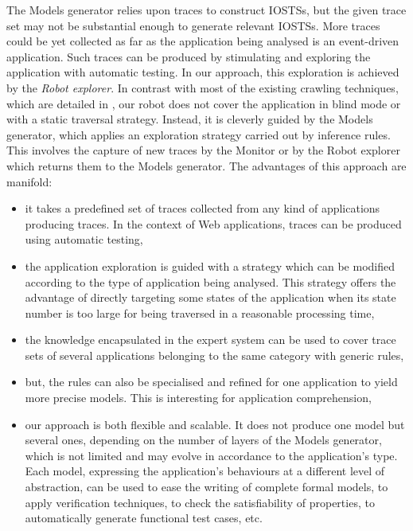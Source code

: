 The Models generator relies upon traces to construct IOSTSs, but
the given trace set may not be substantial enough to generate
relevant IOSTSs. More traces could be yet collected as far as
the application being analysed is an event-driven application.
Such traces can be produced by stimulating and exploring the
application with automatic testing. In our approach, this
exploration is achieved by the \emph{Robot explorer}. In contrast
with most of the existing crawling techniques, which are detailed
in , our
robot does not cover the application in blind mode or with a
static traversal strategy.  Instead, it is cleverly guided by the
Models generator, which applies an exploration strategy carried
out by inference rules.  This involves the capture of new traces
by the Monitor or by the Robot explorer which returns them to the
Models generator. The advantages of this approach are manifold:

\begin{itemize}
\item it takes a predefined set of traces collected from any kind
of applications producing traces. In the context of Web
applications, traces can be produced using automatic testing,

\item the application exploration is guided with a strategy which
can be modified according to the type of application being
analysed. This strategy offers the advantage of directly targeting
some states of the application when its state number is too large
for being traversed in a reasonable processing time,

\item the knowledge encapsulated in the expert system can be used
to cover trace sets of several applications belonging to the same
category with generic rules,

\item but, the rules can also be specialised and refined for one
application to yield more precise models. This is interesting for
application comprehension,

\item our approach is both flexible and scalable. It does not
produce one model but several ones, depending on the number of
layers of the Models generator, which is not limited and may
evolve in accordance to the application's type. Each model,
expressing the application's behaviours at a different level of
abstraction, can be used to ease the writing of complete formal
models, to apply verification techniques, to check the
satisfiability of properties, to automatically generate
functional test cases, etc.
\end{itemize}


